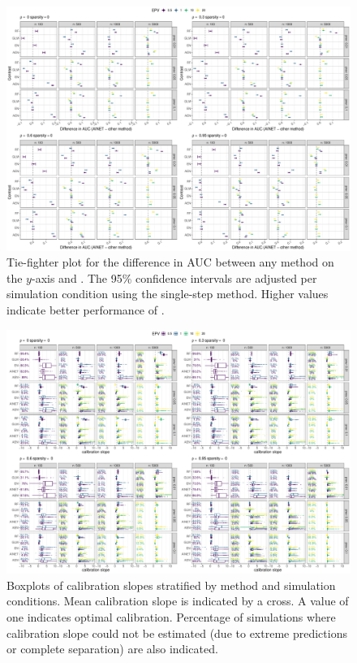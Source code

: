 \documentclass[a4paper, 11pt]{article}
\begin{document}
\begin{landscape}
\begin{figure}[!ht]
\center
\includegraphics[width=0.8\linewidth]{figures-appendix/tie-fighter_auc_sparsity0.pdf}
\caption{Tie-fighter plot for the difference in AUC between any method on
  the $y$-axis and \ainet{}. The 95\% confidence intervals are adjusted per
  simulation condition using the single-step method. Higher values indicate
  better performance of \ainet{}. } \label{fig:tieauc}
\end{figure}
\end{landscape}

\begin{landscape}
\begin{figure}[!ht]
\center
\includegraphics[width=0.8\linewidth]{figures-appendix/calibration-cslope_sparsity0.pdf}
\caption{Boxplots of calibration slopes stratified by method and simulation
  conditions. Mean calibration slope is indicated by a cross. A value of one
  indicates optimal calibration. Percentage of simulations where calibration
  slope could not be estimated (due to extreme predictions or complete
  separation) are also indicated.} \label{fig:cslope}
\end{figure}
\end{landscape}
\end{document}

